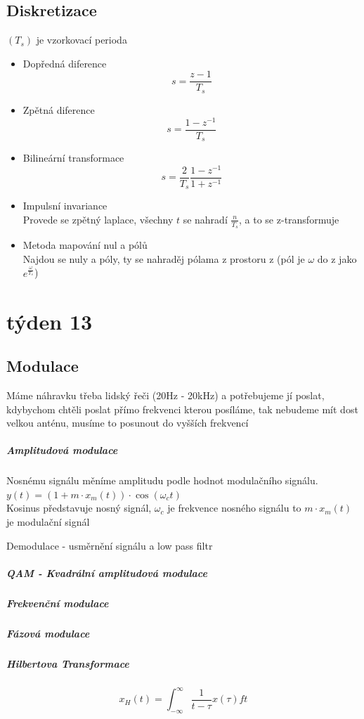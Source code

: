 \documentclass{article}
\begin{document}
	\subsection*{Diskretizace}
	$(T_s)$ je vzorkovací perioda
	\begin{itemize}
		\item Dopředná diference
			\[s=\frac{z-1}{T_s}\]
		\item Zpětná diference
			\[s=\frac{1-z^{-1}}{T_s}\]
		\item Bilineární transformace
			\[s=\frac{2}{T_s}\frac{1-z^{-1}}{1+z^{-1}}\]
		\item Impulsní invariance\\
			Provede se zpětný laplace, všechny $t$ se nahradí $\frac{n}{T_s}$,
			a to se z-transformuje
		\item Metoda mapování nul a pólů\\
			Najdou se nuly a póly, ty se nahraděj pólama z prostoru z
			(pól je $\omega$ do z jako $e^{\frac{\omega}{T_s}}$)
	\end{itemize}
\section*{týden 13}
	\subsection*{Modulace}
		Máme náhravku třeba lidský řeči (20Hz - 20kHz) a potřebujeme jí poslat, kdybychom
		chtěli poslat přímo frekvenci kterou posíláme, tak nebudeme mít dost velkou anténu, 
		musíme to posunout do vyšších frekvencí

		\subparagraph*{Amplitudová modulace}
			Nosnému signálu měníme amplitudu podle hodnot modulačního signálu.\\
			$y(t) = (1+m\cdot x_m(t))\cdot\cos(\omega_c t)$\\
			Kosinus představuje  nosný signál, $\omega_c$ je frekvence nosného signálu
			to $m \cdot x_m(t)$ je modulační signál

			Demodulace - usměrnění signálu a low pass filtr

		
		\subparagraph*{QAM - Kvadrální amplitudová modulace}

		\subparagraph*{Frekvenční modulace}

		\subparagraph*{Fázová modulace}

		\subparagraph*{Hilbertova Transformace}
			\[x_H(t)=\int_{-\infty}^{\infty}\frac{1}{t-\tau}x(\tau)ft\]
\end{document}
